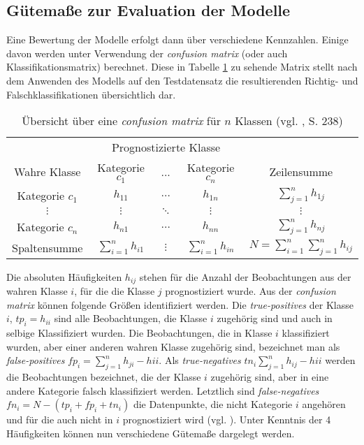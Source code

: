 \documentclass[a4paper,11pt]{article}
\begin{document}
\subsection{Gütemaße zur Evaluation der Modelle}\label{kap:guetemass}

Eine Bewertung der Modelle erfolgt dann über verschiedene Kennzahlen. Einige davon werden unter Verwendung der \textit{confusion matrix} (oder auch Klassifikationsmatrix) berechnet. Diese in Tabelle \ref{tab:confusionMatrix} zu sehende Matrix stellt nach dem Anwenden des Modells auf den Testdatensatz die resultierenden Richtig- und Falschklassifikationen übersichtlich dar.

\begin{table}[ht]
\begin{center}
\begin{tabular}{|c|ccc|c|}
  \hline
 & \multicolumn{3}{|c|}{Prognostizierte Klasse} &  \\
Wahre Klasse & Kategorie $c_1$ & ...  & Kategorie $c_n$ & Zeilensumme  \\ 
  \hline
Kategorie $c_1$ & $h_{11}$ & $\hdots$ & $h_{1n}$ & $\sum_{j=1}^n h_{1j}$\\
$\vdots$ & $\vdots$ & $\ddots$ & $\vdots$ & $\vdots$ \\
Kategorie $c_n$ & $h_{n1}$ & $\hdots$ & $h_{nn}$ & $\sum_{j=1}^n h_{nj}$\\
\hline
Spaltensumme & $\sum_{i=1}^n h_{i1}$ & $\vdots$ & $\sum_{i=1}^n h_{in}$ & 
$N = \sum_{i=1}^n \sum_{j=1}^n h_{ij}$\\
   \hline
\end{tabular}
\label{tab:confusionMatrix}

  \caption{Übersicht über eine \textit{confusion matrix}  für $n$  Klassen (vgl. \cite{backhaus}, S. 238)}  
\end{center}
\end{table}

Die absoluten Häufigkeiten $h_{ij}$ stehen für die Anzahl der Beobachtungen aus der wahren Klasse $i$, für die die Klasse $j$ prognostiziert wurde. Aus der \textit{confusion matrix} können folgende Größen identifiziert werden. Die \textit{true-positives} der Klasse $i$, $tp_i = h_{ii}$ sind alle Beobachtungen, die Klasse $i$ zugehörig sind und auch in selbige Klassifiziert wurden. Die Beobachtungen, die in Klasse $i$ klassifiziert wurden, aber einer anderen wahren Klasse zugehörig sind, bezeichnet man als \textit{false-positives} $fp_i = \sum_{j = 1}^n h_{ji} - h{ii}$. Als \textit{true-negatives} $tn_i \sum_{j = 1}^n h_{ij} - h{ii}$ werden die Beobachtungen bezeichnet, die der Klasse $i$ zugehörig sind, aber in eine andere Kategorie falsch klassifiziert werden. Letztlich sind \textit{false-negatives} $fn_i = N - (tp_i + fp_i + tn_i)$ die Datenpunkte, die nicht Kategorie $i$ angehören und für die auch nicht in $i$ prognostiziert wird (vgl. \cite{sokolova}). Unter Kenntnis der 4 Häufigkeiten können nun verschiedene Gütemaße dargelegt werden. 
\end{document}
